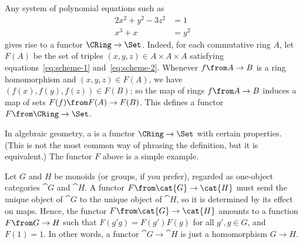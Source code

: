 \begin{example}
Any system of polynomial%
%
%
%
equations such as
% 
\begin{align}
2x^2 + y^2 - 3z^2       &
= 
1
\label{eq:scheme-1}     \\
x^3 + x     &
=
y^2       
\label{eq:scheme-2}
\end{align}
% 
gives rise to a functor $\CRing \to \Set$.  Indeed, for each commutative
ring $A$, let $F(A)$ be the set of triples $(x, y, z) \in A \times A \times
A$ satisfying equations~\eqref{eq:scheme-1} and~\eqref{eq:scheme-2}.
Whenever $f\from A \to B$ is a ring homomorphism and $(x, y, z) \in F(A)$,
we have $(f(x), f(y), f(z)) \in F(B)$; so the map of rings $f\from A \to B$
induces a map of sets $F(f) \from F(A) \to F(B)$.  This defines a functor
$F\from \CRing \to \Set$.

In algebraic%
%
%
geometry, a %
%
%
is a functor $\CRing \to \Set$ with certain properties.  (This is not the
most common way of phrasing the definition, but it is equivalent.)  The
functor $F$ above is a simple example.
\end{example}

\begin{example}
\label{eg:ftrs-between-monoids}
Let $G$ and $H$ be monoids (or groups, if you prefer), regarded as
one-object%
%
%
categories $\cat{G}$ and $\cat{H}$.  A functor $F\from \cat{G} \to \cat{H}$
must send the unique object of $\cat{G}$ to the unique object of $\cat{H}$,
so it is determined by its effect on maps.  Hence, the functor $F \from
\cat{G} \to \cat{H}$ amounts to a function $F\from G \to H$ such that $F(g'
g) = F(g') F(g)$ for all $g', g \in G$, and $F(1) = 1$.  In other words, a
functor $\cat{G} \to \cat{H}$ is just a homomorphism $G \to H$.
\end{example}

